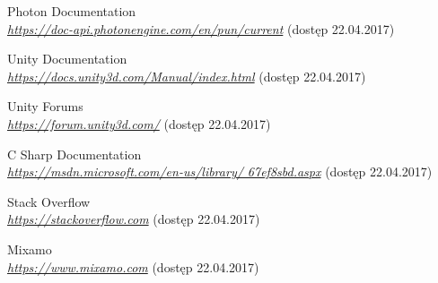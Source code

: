 \begin{thebibliography}{9}
Photon Documentation\\
\textit{\url{https://doc-api.photonengine.com/en/pun/current}} (dostęp 22.04.2017)

Unity Documentation\\
\textit{\url{https://docs.unity3d.com/Manual/index.html}} (dostęp 22.04.2017)

Unity Forums\\
\textit{\url{https://forum.unity3d.com/}} (dostęp 22.04.2017)

C Sharp Documentation\\
\textit{\url{https://msdn.microsoft.com/en-us/library/
67ef8sbd.aspx}} (dostęp 22.04.2017)

Stack Overflow\\
\textit{\url{https://stackoverflow.com}} (dostęp 22.04.2017)

Mixamo\\
\textit{\url{https://www.mixamo.com}} (dostęp 22.04.2017)
\end{thebibliography}